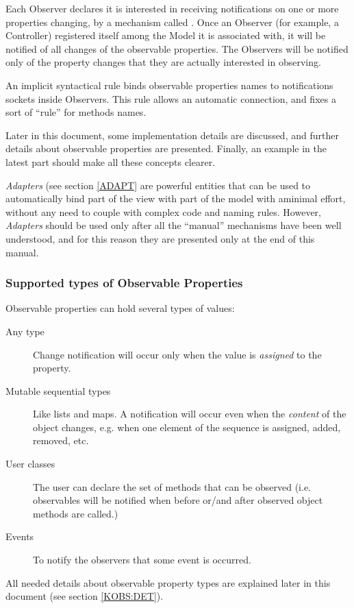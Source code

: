 Each Observer declares it is interested in receiving notifications on
one or more properties changing, by a mechanism called
. Once an Observer (for example, a Controller)
registered itself among the Model it is associated with, it will be
notified of all changes of the observable properties. The Observers
will be notified only of the property changes that they are actually
interested in observing.

An implicit syntactical rule binds observable properties names to
notifications sockets inside Observers. This rule allows an automatic
connection, and fixes a sort of ``rule'' for methods names.

Later in this document, some implementation details are discussed, and
further details about observable properties are presented. Finally,
an example in the latest part should make all these concepts clearer.

\emph{Adapters} (see section \ref{ADAPT} are powerful entities that
can be used to automatically bind part of the view with part of the
model with aminimal effort, without any need to couple with complex
code and naming rules. However, \emph{Adapters} should be used only
after all the ``manual'' mechanisms have been well understood, and
for this reason they are presented only at the end of this manual.


\subsubsection{\label{KOBS} Supported types of Observable Properties}

Observable properties can hold several types of values:

\begin{description}
\item [Any type] Change notification will occur only when the value is
  \emph{assigned} to the property.

\item [Mutable sequential types] Like lists and maps. A notification
  will occur even when the \emph{content} of the object changes, e.g.
  when one element of the sequence is assigned, added, removed, etc.
 
\item [User classes] The user can declare the set of methods that can
  be observed (i.e. observables will be notified when before or/and
  after observed object methods are called.) 

\item [Events] To notify the observers that some event is occurred.
\end{description}

All needed details about observable property types are explained later
in this document (see section \ref{KOBS:DET}).
